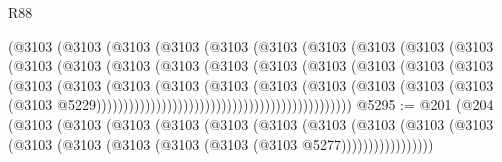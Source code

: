 \begin{lexlean}{R88}
\begin{coremodule}
                                    (@3103
                                      (@3103
                                        (@3103
                                          (@3103
                                            (@3103
                                              (@3103
                                                (@3103
                                                  (@3103
                                                    (@3103
                                                      (@3103
                                                        (@3103
                                                          (@3103
                                                            (@3103
                                                              (@3103
                                                                (@3103
                                                                  (@3103
                                                                    (@3103
                                                                      (@3103
                                                                        (@3103
                                                                          (@3103
                                                                            (@3103
                                                                              (@3103
                                                                                (@3103
                                                                                  (@3103
                                                                                    (@3103
                                                                                      (@3103
                                                                                        (@3103
                                                                                          (@3103
                                                                                            (@3103
                                                                                              (@3103
                                                                                                (@3103
                                                                                                  @5229)))))))))))))))))))))))))))))))))))))))))))))))
@5295 := @201
    (@204
      (@3103
        (@3103
          (@3103
            (@3103
              (@3103
                (@3103
                  (@3103
                    (@3103
                      (@3103 (@3103 (@3103 (@3103 (@3103 (@3103 (@3103 (@3103 @5277)))))))))))))))))

\end{coremodule}
\end{lexlean}
